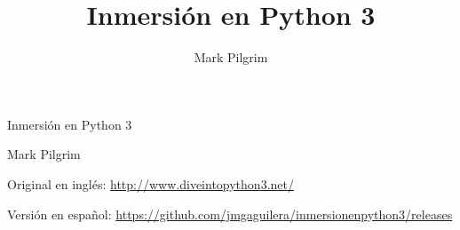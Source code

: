 \documentclass[12pt,leqno,a4paper,spanish]{book}
\title{Inmersión en Python 3}
\author{Mark Pilgrim}
\begin{document}
\begin{latexonly}
\raggedbottom
{}
\end{latexonly}

\pagestyle{empty}
\frontmatter


\vspace*{\fill}
\begin{center}

  {\Huge Inmersión en Python 3}

  \begin{latexonly}
\end{latexonly}

  {\Large Mark Pilgrim}


\end{center}
\vspace{\fill}
\vspace{\fill}

\begin{flushright}
  Original en inglés: \href{http://www.diveintopython3.net/}{http://www.diveintopython3.net/}

  Versión en español: \href{https://github.com/jmgaguilera/inmersionenpython3/releases}{https://github.com/jmgaguilera/inmersionenpython3/releases} 
\end{flushright}

\clearpage

\pagestyle{headings}



\tableofcontents
\cleardoublepage

\pagestyle{headings}


















\appendix





\printindex
\end{document}
